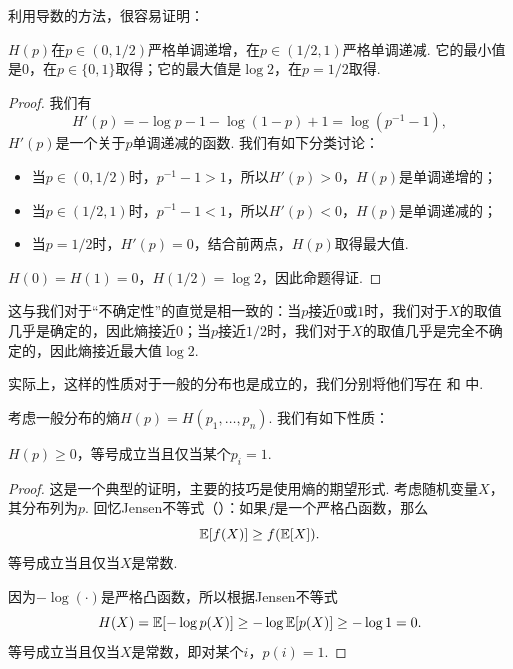 利用导数的方法，很容易证明：
\begin{proposition}\label{prop:entropy-2prob}
    $H(p)$在$p\in (0,1/2)$严格单调递增，在$p\in (1/2,1)$严格单调递减. 它的最小值是$0$，在$p\in\{0,1\}$取得；它的最大值是$\log 2$，在$p=1/2$取得.    
\end{proposition}
\begin{proof}
    我们有
    \[H'(p)=-\log p-1-\log(1-p)+1=\log(p^{-1}-1),\]
    $H'(p)$是一个关于$p$单调递减的函数. 我们有如下分类讨论：
    \begin{itemize}
        \item 当$p\in (0,1/2)$时，$p^{-1}-1>1$，所以$H'(p)>0$，$H(p)$是单调递增的；
        \item 当$p\in (1/2,1)$时，$p^{-1}-1<1$，所以$H'(p)<0$，$H(p)$是单调递减的；
        \item 当$p=1/2$时，$H'(p)=0$，结合前两点，$H(p)$取得最大值. 
    \end{itemize}
    $H(0)=H(1)=0$，$H(1/2)=\log 2$，因此命题得证.
\end{proof}
这与我们对于“不确定性”的直觉是相一致的：当$p$接近$0$或$1$时，我们对于$X$的取值几乎是确定的，因此熵接近$0$；当$p$接近$1/2$时，我们对于$X$的取值几乎是完全不确定的，因此熵接近最大值$\log 2$. 
 
实际上，这样的性质对于一般的分布也是成立的，我们分别将他们写在 和 中.

考虑一般分布的熵$H(p)=H(p_1,\dots,p_n)$. 我们有如下性质：
\begin{proposition}\label{prop:entropy-nonnegative}
    $H(p)\geq 0$，等号成立当且仅当某个$p_i=1$.
\end{proposition}
\begin{proof}
这是一个典型的证明，主要的技巧是使用熵的期望形式. 考虑随机变量$X$，其分布列为$p$. 回忆Jensen不等式（）：如果$f$是一个严格凸函数，那么
\[\mathbb{E}[f(X)]\geq f(\mathbb{E}[X]).\]
等号成立当且仅当$X$是常数.

因为$-\log(\cdot)$是严格凸函数，所以根据Jensen不等式
\[H(X)=\mathbb{E}[-\log p(X)]\geq-\log\mathbb{E}[p(X)]\geq -\log 1=0.\]
等号成立当且仅当$X$是常数，即对某个$i$，$p(i)=1$.
\end{proof}

